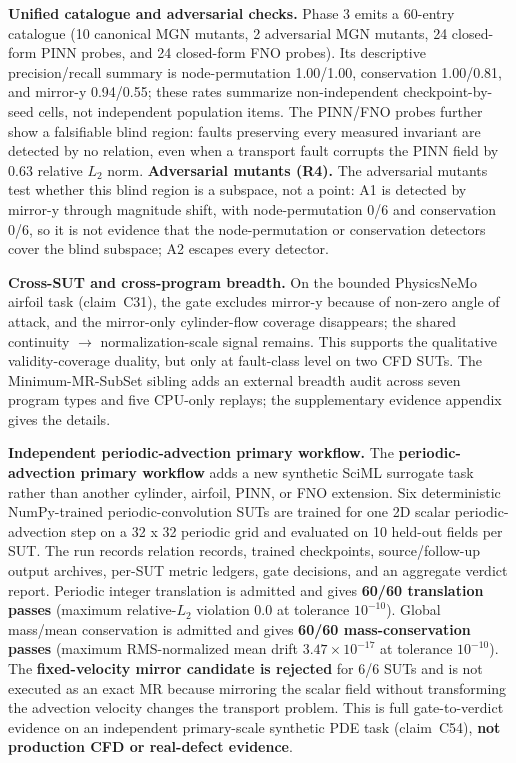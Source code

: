 \documentclass[preprint,12pt,authoryear]{elsarticle}
\begin{document}
\textbf{Unified catalogue and adversarial checks.} Phase 3 emits a 60-entry catalogue (10 canonical MGN mutants, 2 adversarial MGN mutants, 24 closed-form PINN probes, and 24 closed-form FNO probes). Its descriptive precision/recall summary is node-permutation 1.00/1.00, conservation 1.00/0.81, and mirror-y 0.94/0.55; these rates summarize non-independent checkpoint-by-seed cells, not independent population items. The PINN/FNO probes further show a falsifiable blind region: faults preserving every measured invariant are detected by no relation, even when a transport fault corrupts the PINN field by 0.63 relative \(L_2\) norm. \textbf{Adversarial mutants (R4).} The adversarial mutants test whether this blind region is a subspace, not a point: A1 is detected by mirror-y through magnitude shift, with node-permutation 0/6 and conservation 0/6, so it is not evidence that the node-permutation or conservation detectors cover the blind subspace; A2 escapes every detector.

\textbf{Cross-SUT and cross-program breadth.} On the bounded PhysicsNeMo airfoil task (claim~C31), the gate excludes mirror-y because of non-zero angle of attack, and the mirror-only cylinder-flow coverage disappears; the shared continuity $\to$ normalization-scale signal remains. This supports the qualitative validity-coverage duality, but only at fault-class level on two CFD SUTs. The Minimum-MR-SubSet sibling adds an external breadth audit across seven program types and five CPU-only replays; the supplementary evidence appendix gives the details.

\textbf{Independent periodic-advection primary workflow.} The \textbf{periodic-advection primary workflow} adds a new synthetic SciML surrogate task rather than another cylinder, airfoil, PINN, or FNO extension. Six deterministic NumPy-trained periodic-convolution SUTs are trained for one 2D scalar periodic-advection step on a 32 x 32 periodic grid and evaluated on 10 held-out fields per SUT. The run records relation records, trained checkpoints, source/follow-up output archives, per-SUT metric ledgers, gate decisions, and an aggregate verdict report. Periodic integer translation is admitted and gives \textbf{60/60 translation passes} (maximum relative-\(L_2\) violation 0.0 at tolerance $10^{-10}$). Global mass/mean conservation is admitted and gives \textbf{60/60 mass-conservation passes} (maximum RMS-normalized mean drift $3.47\times10^{-17}$ at tolerance $10^{-10}$). The \textbf{fixed-velocity mirror candidate is rejected} for 6/6 SUTs and is not executed as an exact MR because mirroring the scalar field without transforming the advection velocity changes the transport problem. This is full gate-to-verdict evidence on an independent primary-scale synthetic PDE task (claim~C54), \textbf{not production CFD or real-defect evidence}.
\end{document}
